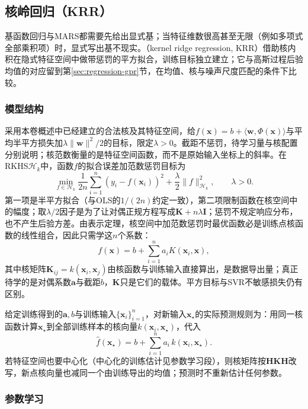 \subsection{核岭回归（KRR）}
\label{sec:regression-krr}

基函数回归与MARS都需要先给出显式基；当特征维数很高甚至无限（例如多项式全部乘积项）时，显式写出基不现实。（kernel ridge regression, KRR）借助核内积在隐式特征空间中做带惩罚的平方拟合，训练目标独立建立；它与高斯过程后验均值的对应留到第\ref{sec:regression-gpr}节，在均值、核与噪声尺度匹配的条件下比较。

\subsubsection{模型结构}
\label{sec:regression-krr-structure}

采用本卷概述中已经建立的合法核及其特征空间，给$f(\bm{x})=b+\langle\bm{w},\Phi(\bm{x})\rangle$与平均半平方损失加$\lambda\lVert\bm{w}\rVert^2/2$的目标，限定$\lambda>0$。截距不惩罚，待学习量与核配置分别说明；核范数衡量的是特征空间函数，而不是原始输入坐标上的斜率。在RKHS$\mathcal H_k$中，函数$f$的拟合误差加范数惩罚目标为
\begin{equation}
  \min_{f\in\mathcal H_k}
  \frac{1}{2n}\sum_{i=1}^n(y_i-f(\bm{x}_i))^2
  +\frac{\lambda}{2}\lVert f\rVert_{\mathcal H_k}^2,
  \qquad\lambda>0.
  \label{eq:regression-krr-objective}
\end{equation}
第一项是半平方拟合（与OLS的$1/(2n)$约定一致），第二项限制函数在核空间中的幅度；取$\lambda/2$因子是为了让对偶正规方程写成$\bm{K}+n\lambda\bm{I}$；惩罚不规定响应分布，也不产生后验方差。由表示定理，核空间中加范数惩罚时最优函数必是训练点核函数的线性组合，因此只需学这$n$个系数：
\[
  f(\bm{x})=b+\sum_{i=1}^n a_iK(\bm{x}_i,\bm{x}),
\]
其中核矩阵$\bm{K}_{ij}=k(\bm{x}_i,\bm{x}_j)$由核函数与训练输入直接算出，是数据导出量；真正待学的是对偶系数$\bm{a}$与截距$b$，$\bm{K}$只是它们的载体。平方目标与SVR不敏感损失仍有区别。

给定训练得到的$\bm{a},b$与训练输入$\{\bm{x}_i\}_{i=1}^n$，对新输入$\bm{x}_\star$的实际预测规则为：用同一核函数计算$\bm{x}_\star$到全部训练样本的核向量$k(\bm{x}_i,\bm{x}_\star)$，代入
\[
  \widehat f(\bm{x}_\star)=b+\sum_{i=1}^n a_i\,k(\bm{x}_i,\bm{x}_\star).
\]
若特征空间也要中心化（中心化的训练估计见参数学习段），则核矩阵按$\bm{H}\bm{K}\bm{H}$改写，新点核向量也减同一个由训练导出的均值；预测时不重新估计任何参数。

\subsubsection{参数学习}
\label{sec:regression-krr-learning}

